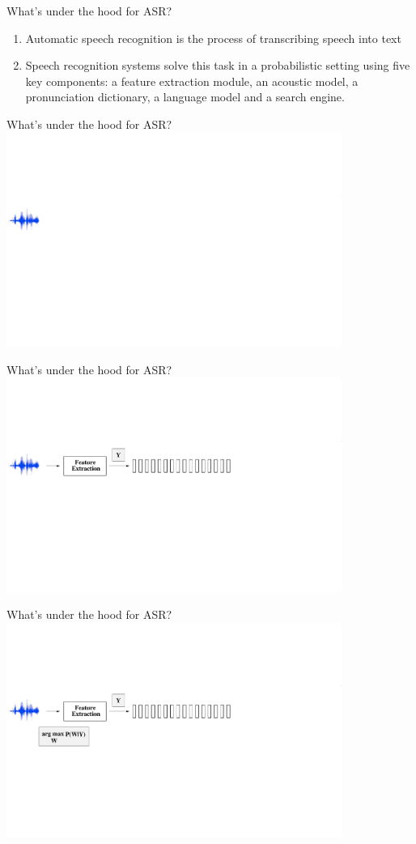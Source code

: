 \begin{frame}{What's under the hood for ASR?}
\begin{enumerate}
\item Automatic speech recognition is the process of transcribing speech into text
\item Speech recognition systems solve this task in a probabilistic setting using five key
components: a feature extraction module, an acoustic model, a pronunciation dictionary, a language model
and a search engine.
\end{enumerate}
\end{frame}

\begin{frame}{What's under the hood for ASR?}
\includegraphics[height=70mm]{figures/ASR1}
\end{frame}

\begin{frame}{What's under the hood for ASR?}
\includegraphics[height=70mm]{figures/ASR2}
\end{frame}

\begin{frame}{What's under the hood for ASR?}
\includegraphics[height=70mm]{figures/ASR3}
\end{frame}

